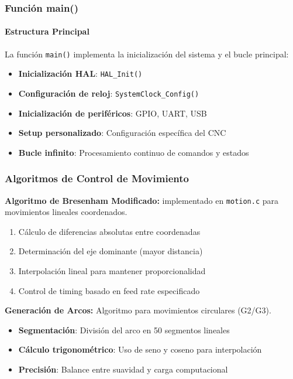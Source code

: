 \documentclass[12pt]{article}
\begin{document}
\subsubsection{Función main()}

\paragraph{Estructura Principal}
La función \texttt{main()} implementa la inicialización del sistema y el bucle principal:

\begin{itemize}
    \item \textbf{Inicialización HAL}: \texttt{HAL\_Init()}
    \item \textbf{Configuración de reloj}: \texttt{SystemClock\_Config()}
    \item \textbf{Inicialización de periféricos}: GPIO, UART, USB
    \item \textbf{Setup personalizado}: Configuración específica del CNC
    \item \textbf{Bucle infinito}: Procesamiento continuo de comandos y estados
\end{itemize}

\subsubsection{Algoritmos de Control de Movimiento}

\textbf{Algoritmo de Bresenham Modificado:} implementado en \texttt{motion.c} para movimientos lineales coordenados.

\begin{enumerate}
    \item Cálculo de diferencias absolutas entre coordenadas
    \item Determinación del eje dominante (mayor distancia)
    \item Interpolación lineal para mantener proporcionalidad
    \item Control de timing basado en feed rate especificado
\end{enumerate}

\textbf{Generación de Arcos:} Algoritmo para movimientos circulares (G2/G3).

\begin{itemize}
    \item \textbf{Segmentación}: División del arco en 50 segmentos lineales
    \item \textbf{Cálculo trigonométrico}: Uso de seno y coseno para interpolación
    \item \textbf{Precisión}: Balance entre suavidad y carga computacional
\end{itemize}
\end{document}
